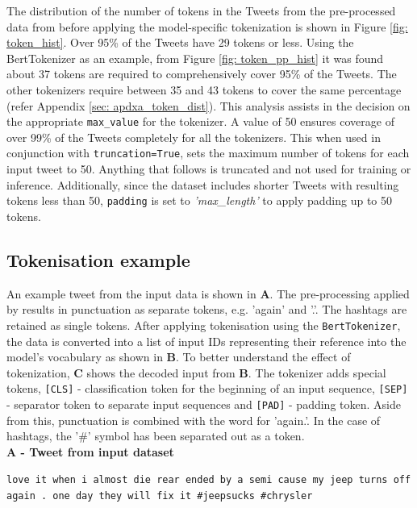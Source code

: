 The distribution of the number of tokens in the Tweets from the pre-processed data from \cite{preotiuc-pietro_automatically_2019,jinModelingSeverityComplaints2021} before applying the model-specific tokenization is shown in Figure \ref{fig: token_hist}. Over 95\% of the Tweets have 29 tokens or less. Using the BertTokenizer as an example, from Figure \ref{fig: token_pp_hist} it was found about 37 tokens are required to comprehensively cover 95\% of the Tweets. The other tokenizers require between 35 and 43 tokens to cover the same percentage (refer Appendix \ref{sec: apdxa_token_dist}). This analysis assists in the decision on the appropriate \texttt{max\_value} for the tokenizer. A value of 50 ensures coverage of over 99\% of the Tweets completely for all the tokenizers. This when used in conjunction with \texttt{truncation=True}, sets the maximum number of tokens for each input tweet to 50. Anything that follows is truncated and not used for training or inference. Additionally, since the dataset includes shorter Tweets with resulting tokens less than 50, \texttt{padding} is set to \emph{'max\_length'} to apply padding up to 50 tokens.


\subsection{Tokenisation example}
An example tweet from the input data is shown in \textbf{A}. The pre-processing applied by \cite{preotiuc-pietro_automatically_2019,jinModelingSeverityComplaints2021} results in punctuation as separate tokens, e.g. 'again' and '.'. The hashtags are retained as single tokens. After applying tokenisation using the \texttt{BertTokenizer}, the data is converted into a list of input IDs representing their reference into the model's vocabulary as shown in \textbf{B}. To better understand the effect of tokenization, \textbf{C} shows the decoded input from \textbf{B}. The tokenizer adds special tokens, \texttt{[CLS]} - classification token for the beginning of an input sequence, \texttt{[SEP]} - separator token to separate input sequences and \texttt{[PAD]} - padding token. Aside from this, punctuation is combined with the word for 'again.'. In the case of hashtags, the '\#' symbol has been separated out as a token.\\

\textbf{A - Tweet from input dataset}\newline

\begin{adjustbox}{minipage={\textwidth},fbox}
    \texttt{love it when i almost die rear ended by a semi cause my jeep turns off again
        . one day they will fix it \#jeepsucks \#chrysler}
\end{adjustbox} \newline\newline

